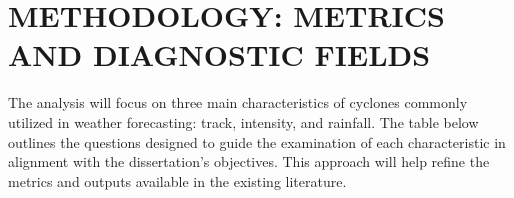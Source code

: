 \chapter{METHODOLOGY: METRICS AND DIAGNOSTIC FIELDS}
\label{ch:methods}


The analysis will focus on three main characteristics of cyclones commonly utilized \cite{deshpande2010impact, bopape2021sensitivity,  zarzycki2021metrics, nyongesa2024influence, mishra2024characteristics} in weather forecasting: track, intensity, and rainfall. The table below outlines the questions designed to guide the examination of each characteristic in alignment with the dissertation's objectives. This approach will help refine the metrics and outputs available in the existing literature.

\begin{center}
 \label{tab:questions}
\end{center}

